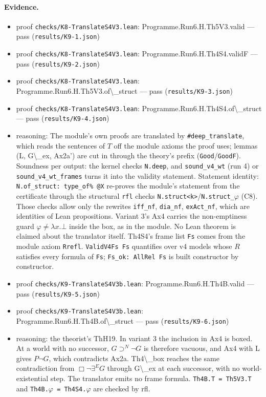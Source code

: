 \documentclass{article}
\begin{document}
\paragraph{Evidence.}
\begin{itemize}
\item proof \texttt{checks/K8-TranslateS4V3.lean}: Programme.Run6.H.Th5V3.valid --- pass (\texttt{results/K9-1.json})
\item proof \texttt{checks/K8-TranslateS4V3.lean}: Programme.Run6.H.Th4S4.validF --- pass (\texttt{results/K9-2.json})
\item proof \texttt{checks/K8-TranslateS4V3.lean}: Programme.Run6.H.Th5V3.of\textbackslash{}\_struct --- pass (\texttt{results/K9-3.json})
\item proof \texttt{checks/K8-TranslateS4V3.lean}: Programme.Run6.H.Th4S4.of\textbackslash{}\_struct --- pass (\texttt{results/K9-4.json})
\item reasoning: The module's own proofs are translated by \texttt{\#deep\_translate}, which reads the sentences of $T$ off the module axioms the proof uses; lemmas (L, G\textbackslash{}\_ex, Ax2a') are cut in through the theory's prefix (\texttt{Good}/\texttt{GoodF}). Soundness per output: the kernel checks \texttt{N.deep}, and \texttt{sound\_v4\_wt} (run 4) or \texttt{sound\_v4\_wt\_frames} turns it into the validity statement. Statement identity: \texttt{N.of\_struct: type\_of\% @X} re-proves the module's statement from the certificate through the structural \texttt{rfl} checks \texttt{N.struct\textless{}k\textgreater{}}/\texttt{N.struct\_$\varphi$} (C8). Those checks allow only the rewrites \texttt{iff\_nf}, \texttt{dia\_nf}, \texttt{exAct\_nf}, which are identities of Lean propositions. Variant 3's Ax4 carries the non-emptiness guard $\varphi\neq\lambda x.\bot$ inside the box, as in the module. No Lean theorem is claimed about the translator itself. Th4S4's frame list \texttt{Fs} comes from the module axiom \texttt{Rrefl}. \texttt{ValidV4Fs Fs} quantifies over v4 models whose $R$ satisfies every formula of \texttt{Fs}; \texttt{Fs\_ok: AllRel Fs} is built constructor by constructor.
\item proof \texttt{checks/K9-TranslateS4V3b.lean}: Programme.Run6.H.Th4B.valid --- pass (\texttt{results/K9-5.json})
\item proof \texttt{checks/K9-TranslateS4V3b.lean}: Programme.Run6.H.Th4B.of\textbackslash{}\_struct --- pass (\texttt{results/K9-6.json})
\item reasoning: the theorist's ThH19. In variant 3 the inclusion in Ax4 is boxed. At a world with no successor, $G\supset^N\neg G$ is therefore vacuous, and Ax4 with L gives $P\neg G$, which contradicts Ax2a. Th4\textbackslash{}\_box reaches the same contradiction from $\Box\neg\exists^E G$ through G\textbackslash{}\_ex at each successor, with no world-existential step. The translator emits no frame formula. \texttt{Th4B.T = Th5V3.T} and \texttt{Th4B.$\varphi$ = Th4S4.$\varphi$} are checked by rfl.
\end{itemize}
\end{document}
